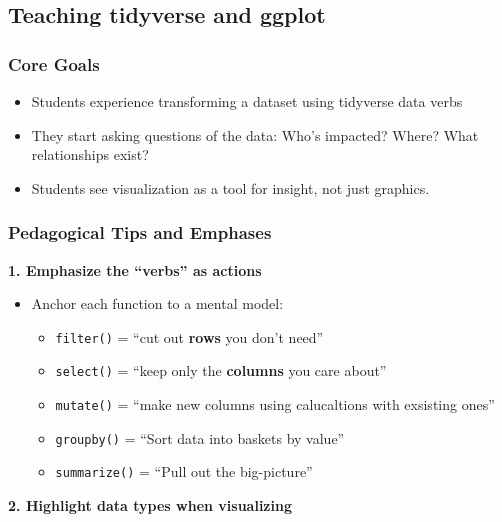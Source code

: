 \documentclass[
  letterpaper,
  DIV=11,
  numbers=noendperiod,
  oneside]{scrartcl}
\begin{document}
\hypertarget{teaching-tidyverse-and-ggplot}{%
\subsection{Teaching tidyverse and
ggplot}\label{teaching-tidyverse-and-ggplot}}

\hypertarget{core-goals}{%
\subsubsection{Core Goals}\label{core-goals}}

\begin{itemize}
\item
  Students experience transforming a dataset using tidyverse data verbs
\item
  They start asking questions of the data: Who's impacted? Where? What
  relationships exist?
\item
  Students see visualization as a tool for insight, not just graphics.
\end{itemize}

\hypertarget{pedagogical-tips-and-emphases}{%
\subsubsection{Pedagogical Tips and
Emphases}\label{pedagogical-tips-and-emphases}}

\textbf{1. Emphasize the ``verbs'' as actions}

\begin{itemize}
\item
  Anchor each function to a mental model:

  \begin{itemize}
  \item
    \texttt{filter()} = ``cut out \textbf{rows} you don't need''
  \item
    \texttt{select()} = ``keep only the \textbf{columns} you care
    about''
  \item
    \texttt{mutate()} = ``make new columns using calucaltions with
    exsisting ones''
  \item
    \texttt{groupby()} = ``Sort data into baskets by value''
  \item
    \texttt{summarize()} = ``Pull out the big-picture''
  \end{itemize}
\end{itemize}

\textbf{2. Highlight data types when visualizing}
\end{document}
